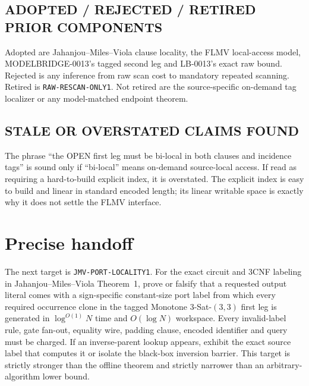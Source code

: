\documentclass[11pt]{article}
\begin{document}
\subsection*{ADOPTED / REJECTED / RETIRED PRIOR COMPONENTS}
Adopted are Jahanjou--Miles--Viola clause locality, the FLMV local-access
model, MODELBRIDGE-0013's tagged second leg and LB-0013's exact raw bound.
Rejected is any inference from raw scan cost to mandatory repeated scanning.
Retired is \texttt{RAW-RESCAN-ONLY1}.  Not retired are the source-specific
on-demand tag localizer or any model-matched endpoint theorem.

\subsection*{STALE OR OVERSTATED CLAIMS FOUND}
The phrase ``the OPEN first leg must be bi-local in both clauses and
incidence tags'' is sound only if ``bi-local'' means on-demand source-local
access.  If read as requiring a hard-to-build explicit index, it is
overstated.  The explicit index is easy to build and linear in standard
encoded length; its linear writable space is exactly why it does not settle
the FLMV interface.

\section{Precise handoff}

The next target is \texttt{JMV-PORT-LOCALITY1}.  For the exact circuit and
3CNF labeling in Jahanjou--Miles--Viola Theorem~1, prove or falsify that a
requested output literal comes with a sign-specific constant-size port label
from which every required occurrence clone in the tagged Monotone
3-Sat-$(3,3)$ first leg is generated in $\log^{O(1)}N$ time and
$O(\log N)$ workspace.  Every invalid-label rule, gate fan-out, equality
wire, padding clause, encoded identifier and query must be charged.  If an
inverse-parent lookup appears, exhibit the exact source label that computes
it or isolate the black-box inversion barrier.  This target is strictly
stronger than the offline theorem and strictly narrower than an
arbitrary-algorithm lower bound.
\end{document}
